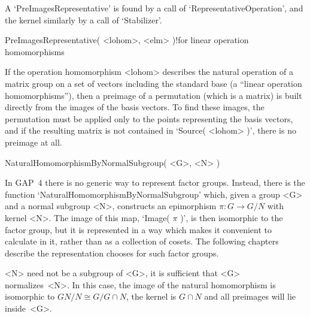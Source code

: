 A     `PreImagesRepresentative'      is   found     by   a       call  of
`RepresentativeOperation', and  the  kernel    similarly by a    call  of
`Stabilizer'.

\>PreImagesRepresentative( <lohom>, <elm> )!{for linear operation %
  homomorphisms}

If the operation homomorphism  <lohom> describes the natural operation of
a   matrix group on  a  set  of  vectors including   the standard base (a
``linear operation homomorphisms''),   then a preimage of a   permutation
(which is  a matrix) is  built  directly from the   images  of the  basis
vectors. To find  these images, the permutation  must be  applied only to
the points representing the basis vectors, and if the resulting matrix is
not contained in `Source( <lohom> )', there is no preimage at all.

\stars

\>NaturalHomomorphismByNormalSubgroup( <G>, <N> )

In  {\sf GAP~4}  there  is no  generic  way  to represent factor  groups.
Instead,  there  is   the function  `NaturalHomomorphismByNormalSubgroup'
which,  given  a group   <G>  and a  normal  subgroup <N>,  constructs an
epimorphism $\pi\colon G\to G/N$ with kernel <N>. The  image of this map,
`Image( $\pi$ )', is  then  isomorphic to the  factor  group, but  it  is
represented in a way which makes it convenient to calculate in it, rather
than as a   collection of cosets.  The  following  chapters describe  the
representation {\GAP} chooses for such factor groups.

<N> need  not be    a subgroup   of  <G>,   it  is sufficient   that  <G>
normalizes~<N>. In this  case, the image  of the natural homomorphism  is
isomorphic to $GN/N  \cong G/G\cap N$,  the kernel is  $G\cap N$ and  all
preimages will lie inside~<G>.

